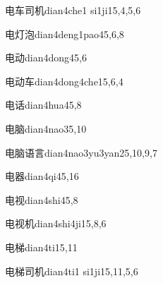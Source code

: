 \begin{verbete}{电车司机}{dian4che1 si1ji1}{5,4,5,6}
\end{verbete}

\begin{verbete}{电灯泡}{dian4deng1pao4}{5,6,8}
\end{verbete}

\begin{verbete}{电动}{dian4dong4}{5,6}
\end{verbete}

\begin{verbete}{电动车}{dian4dong4che1}{5,6,4}
\end{verbete}

\begin{verbete}{电话}{dian4hua4}{5,8}
\end{verbete}

\begin{verbete}{电脑}{dian4nao3}{5,10}
\end{verbete}

\begin{verbete}{电脑语言}{dian4nao3yu3yan2}{5,10,9,7}
\end{verbete}

\begin{verbete}{电器}{dian4qi4}{5,16}
\end{verbete}

\begin{verbete}{电视}{dian4shi4}{5,8}
\end{verbete}

\begin{verbete}{电视机}{dian4shi4ji1}{5,8,6}
\end{verbete}

\begin{verbete}{电梯}{dian4ti1}{5,11}
\end{verbete}

\begin{verbete}{电梯司机}{dian4ti1 si1ji1}{5,11,5,6}
\end{verbete}

